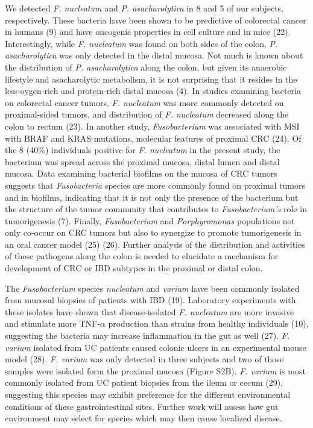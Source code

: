 \documentclass[12pt,]{article}
\begin{document}
We detected \emph{F. nucleatum} and \emph{P. asacharolytica} in 8 and 5
of our subjects, respectively. These bacteria have been shown to be
predictive of colorectal cancer in humans (9) and have oncogenic
properties in cell culture and in mice (22). Interestingly, while
\emph{F. nucleatum} was found on both sides of the colon, \emph{P.
asacharolytica} was only detected in the distal mucosa. Not much is
known about the distribution of \emph{P. asacharolytica} along the
colon, but given its anaerobic lifestyle and asacharolytic metabolism,
it is not surprising that it resides in the less-oygen-rich and
protein-rich distal mucosa (4). In studies examining bacteria on
colorectal cancer tumors, \emph{F. nucleatum} was more commonly detected
on proximal-sided tumors, and distribution of \emph{F. nucleatum}
decreased along the colon to rectum (23). In another study,
\emph{Fusobacterium} was associated with MSI with BRAF and KRAS
mutations, molecular features of proximal CRC (24). Of the 8 (40\%)
individuals positive for \emph{F. nucleatum} in the present study, the
bacterium was spread across the proximal mucosa, distal lumen and distal
mucosa. Data examining bacterial biofilms on the mucosa of CRC tumors
suggests that \emph{Fusobacteria} species are more commonly found on
proximal tumors and in biofilms, indicating that it is not only the
presence of the bacterium but the structure of the tumor community that
contributes to \emph{Fusobacterium's} role in tumorigenesis (7).
Finally, \emph{Fusobacterium} and \emph{Porphyromonas} populations not
only co-occur on CRC tumors but also to synergize to promote
tumorigenesis in an oral cancer model (25) (26). Further analysis of the
distribution and activities of these pathogens along the colon is needed
to elucidate a mechanism for development of CRC or IBD subtypes in the
proximal or distal colon.

The \emph{Fusobacterium} species \emph{nucleatum} and \emph{varium} have
been commonly isolated from mucosal biopsies of patients with IBD (19).
Laboratory experiments with these isolates have shown that
disease-isolated \emph{F. nucleatum} are more invasive and stimulate
more TNF-\(\alpha\) production than strains from healthy individuals
(10), suggesting the bacteria may increase inflammation in the gut as
well (27). \emph{F. varium} isolated from UC patients caused colonic
ulcers in an experimental mouse model (28). \emph{F. varium} was only
detected in three subjects and two of those samples were isolated form
the proximal mucosa (Figure S2B). \emph{F. varium} is most commonly
isolated from UC patient biopsies from the ileum or cecum (29),
suggesting this species may exhibit preference for the different
environmental conditions of these gastrointestinal sites. Further work
will assess how gut environment may select for species which may then
cause localized disease.
\end{document}
